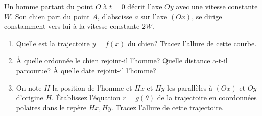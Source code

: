 %
\begin{exercice}%
  Un homme partant du point \(O\) à \(t=0\) décrit l'axe \(Oy\) avec une 
  vitesse constante \(W\). Son chien part du point \(A\), d'abscisse \(a\) sur 
  l'axe \((Ox)\), se dirige constamment vers lui à la vitesse constante \(2W\).
  \begin{enumerate}%
  \item Quelle est la trajectoire \(y=f(x)\) du chien? Tracez l'allure de cette 
    courbe.
  \item À quelle ordonnée le chien rejoint-il l'homme? Quelle distance a-t-il 
    parcourue? À quelle date rejoint-il l'homme?
  \item On note \(H\) la position de l'homme et \(Hx\) et \(Hy\) les parallèles 
    à \((Ox)\) et \(Oy\) d'origine \(H\). Établissez l'équation \(r=g(\theta)\) 
      de la trajectoire en coordonnées polaires dans le repère \(Hx,Hy\). 
      Tracez l'allure de cette trajectoire.
  \end{enumerate}%
\end{exercice}%
